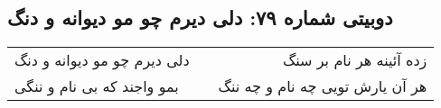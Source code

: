 \begin{center}
\section*{دوبیتی شماره ۷۹: دلی دیرم چو مو دیوانه و دنگ}
\label{sec:079}
\begin{longtable}{l p{0.5cm} r}
دلی دیرم چو مو دیوانه و دنگ
&&
زده آئینه هر نام بر سنگ
\\
بمو واجند که بی نام و ننگی
&&
هر آن یارش تویی چه نام و چه ننگ
\\
\end{longtable}
\end{center}
